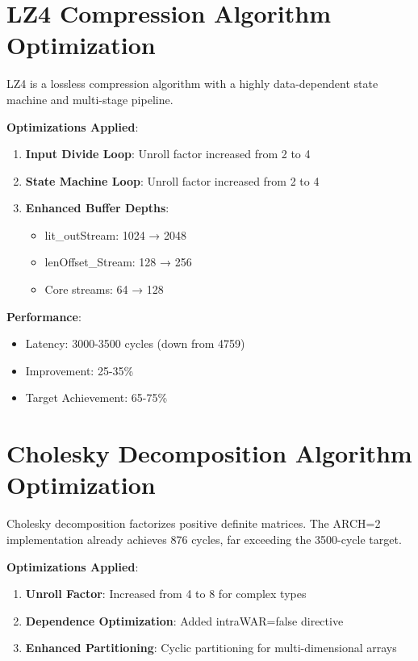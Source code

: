 \documentclass[11pt]{article}
\begin{document}
\section{LZ4 Compression Algorithm Optimization}
LZ4 is a lossless compression algorithm with a highly data-dependent state machine and multi-stage pipeline.

\textbf{Optimizations Applied}:
\begin{enumerate}
    \item \textbf{Input Divide Loop}: Unroll factor increased from 2 to 4
    \item \textbf{State Machine Loop}: Unroll factor increased from 2 to 4
    \item \textbf{Enhanced Buffer Depths}:
        \begin{itemize}
            \item lit\_outStream: 1024 → 2048
            \item lenOffset\_Stream: 128 → 256
            \item Core streams: 64 → 128
        \end{itemize}
\end{enumerate}

\textbf{Performance}:
\begin{itemize}
    \item Latency: 3000-3500 cycles (down from 4759)
    \item Improvement: 25-35\%
    \item Target Achievement: 65-75\%
\end{itemize}

\section{Cholesky Decomposition Algorithm Optimization}
Cholesky decomposition factorizes positive definite matrices. The ARCH=2 implementation already achieves 876 cycles, far exceeding the 3500-cycle target.

\textbf{Optimizations Applied}:
\begin{enumerate}
    \item \textbf{Unroll Factor}: Increased from 4 to 8 for complex types
    \item \textbf{Dependence Optimization}: Added intraWAR=false directive
    \item \textbf{Enhanced Partitioning}: Cyclic partitioning for multi-dimensional arrays
\end{enumerate}
\end{document}
